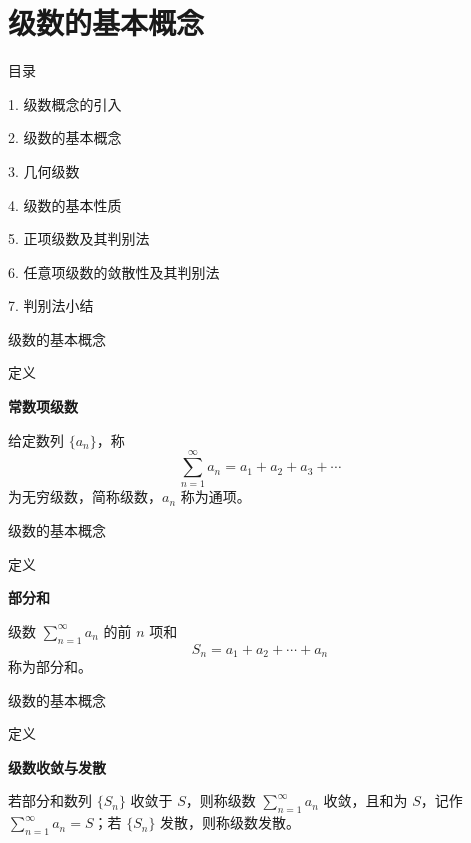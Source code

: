 \documentclass[aspectratio=169,10pt,fontset=fandol]{ctexbeamer}
\begin{document}
\section{级数的基本概念}
\begin{frame}[t,fragile]{目录}
\normalsize
{\color{black}\normalsize 1. 级数概念的引入\par}\vspace{0.22em}
{\color{blue}\normalsize 2. 级数的基本概念\par}\vspace{0.22em}
{\color{gray!40}\normalsize 3. 几何级数\par}\vspace{0.22em}
{\color{gray!40}\normalsize 4. 级数的基本性质\par}\vspace{0.22em}
{\color{gray!40}\normalsize 5. 正项级数及其判别法\par}\vspace{0.22em}
{\color{gray!40}\normalsize 6. 任意项级数的敛散性及其判别法\par}\vspace{0.22em}
{\color{gray!40}\normalsize 7. 判别法小结\par}\vspace{0.22em}
\end{frame}
\begin{frame}[t,fragile]{级数的基本概念}
\normalsize
\begin{block}{定义}
{\normalsize
\textbf{常数项级数}\par

给定数列 \(\{a_n\}\)，称
\[
\sum_{n=1}^{\infty} a_n = a_1 + a_2 + a_3 + \cdots
\]
为无穷级数，简称级数，\(a_n\) 称为通项。

}
\end{block}
\end{frame}
\begin{frame}[t,fragile]{级数的基本概念}
\normalsize
\begin{block}{定义}
{\normalsize
\textbf{部分和}\par

级数 \(\sum\limits_{n = 1}^{  \infty }  a_n\) 的前 \(n\) 项和
\[
S_n = a_1 + a_2 + \cdots + a_n
\]
称为部分和。

}
\end{block}
\end{frame}
\begin{frame}[t,fragile]{级数的基本概念}
\normalsize
\begin{block}{定义}
{\normalsize
\textbf{级数收敛与发散}\par

若部分和数列 \(\{S_n\}\) 收敛于 \(S\)，则称级数 \(\sum\limits_{n = 1}^{  \infty } a_n\) 收敛，且和为 \(S\)，记作 \(\sum\limits_{n = 1}^{  \infty } a_n = S\)；若 \(\{S_n\}\) 发散，则称级数发散。

}
\end{block}
\end{frame}
\end{document}
